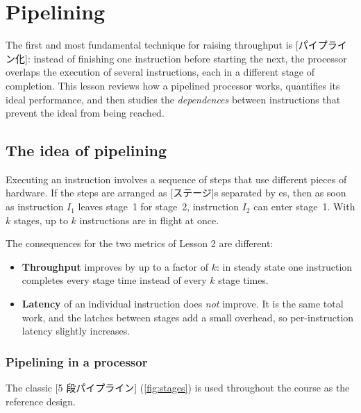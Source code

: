 \documentclass[../main.tex]{subfiles}
\begin{document}
\chapter{Pipelining}

The first and most fundamental technique for raising throughput is
[パイプライン化]: instead of finishing one instruction before starting the next,
the processor overlaps the execution of several instructions, each in a
different stage of completion.  This lesson reviews how a pipelined
processor works, quantifies its ideal performance, and then studies the
\emph{dependences} between instructions that prevent the ideal from being
reached.

\section{The idea of pipelining}

Executing an instruction involves a sequence of steps that use different
pieces of hardware.  If the steps are arranged as [ステージ]s
separated by es, then as soon as instruction $I_1$ leaves stage~1 for
stage~2, instruction $I_2$ can enter stage~1.  With $k$ stages, up to $k$
instructions are in flight at once.

The consequences for the two metrics of Lesson 2 are different:
\begin{itemize}
  \item \textbf{Throughput} improves by up to a factor of $k$: in steady
    state one instruction completes every stage time instead of every $k$
    stage times.
  \item \textbf{Latency} of an individual instruction does \emph{not}
    improve.  It is the same total work, and the latches between stages add
    a small overhead, so per-instruction latency slightly increases.
\end{itemize}

\subsection{Pipelining in a processor}

The classic [5 段パイプライン] (\cref{fig:stages})
is used throughout the course as the reference design.
\end{document}
